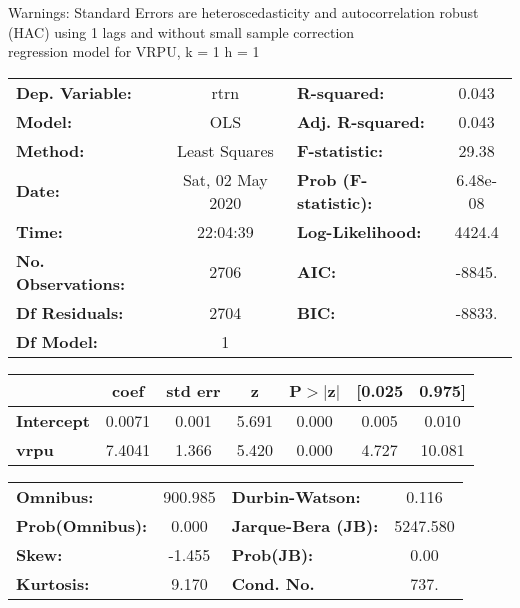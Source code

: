 Warnings: \newline
 [1] Standard Errors are heteroscedasticity and autocorrelation robust (HAC) using 1 lags and without small sample correction\\ 

regression model for VRPU, k = 1 h = 1\begin{center}
\begin{tabular}{lclc}
\toprule
\textbf{Dep. Variable:}    &       rtrn       & \textbf{  R-squared:         } &     0.043   \\
\textbf{Model:}            &       OLS        & \textbf{  Adj. R-squared:    } &     0.043   \\
\textbf{Method:}           &  Least Squares   & \textbf{  F-statistic:       } &     29.38   \\
\textbf{Date:}             & Sat, 02 May 2020 & \textbf{  Prob (F-statistic):} &  6.48e-08   \\
\textbf{Time:}             &     22:04:39     & \textbf{  Log-Likelihood:    } &    4424.4   \\
\textbf{No. Observations:} &        2706      & \textbf{  AIC:               } &    -8845.   \\
\textbf{Df Residuals:}     &        2704      & \textbf{  BIC:               } &    -8833.   \\
\textbf{Df Model:}         &           1      & \textbf{                     } &             \\
\bottomrule
\end{tabular}
\begin{tabular}{lcccccc}
                   & \textbf{coef} & \textbf{std err} & \textbf{z} & \textbf{P$> |$z$|$} & \textbf{[0.025} & \textbf{0.975]}  \\
\midrule
\textbf{Intercept} &       0.0071  &        0.001     &     5.691  &         0.000        &        0.005    &        0.010     \\
\textbf{vrpu}      &       7.4041  &        1.366     &     5.420  &         0.000        &        4.727    &       10.081     \\
\bottomrule
\end{tabular}
\begin{tabular}{lclc}
\textbf{Omnibus:}       & 900.985 & \textbf{  Durbin-Watson:     } &    0.116  \\
\textbf{Prob(Omnibus):} &   0.000 & \textbf{  Jarque-Bera (JB):  } & 5247.580  \\
\textbf{Skew:}          &  -1.455 & \textbf{  Prob(JB):          } &     0.00  \\
\textbf{Kurtosis:}      &   9.170 & \textbf{  Cond. No.          } &     737.  \\
\bottomrule
\end{tabular}
\end{center}

